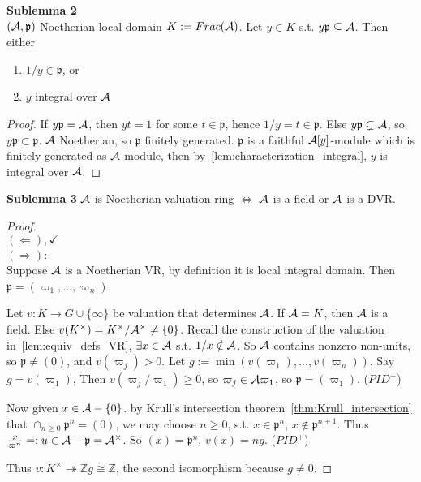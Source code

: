 \documentclass[11pt]{article}
\newcommand{\intg}{\mathbb Z}
\newcommand{\scp}{{\mathfrak p}}
\newcommand{\cala}{{\cal A}}
\newcommand{\Lrta}{\Longrightarrow}
\newcommand{\lrta}{\longrightarrow}
\newcommand{\Llta}{\Longleftarrow}
\newcommand{\Llrta}{\Longleftrightarrow}
\newcommand{\surj}{\twoheadrightarrow}
\begin{document}
\textbf{Sublemma 2}\\
$(\cala,\scp)$ Noetherian local domain $K:=Frac(\cala)$. Let $y\in K$ s.t. $y\scp\subseteq \cala$. Then either
\begin{enumerate}[label=(\roman*)]
\item $1/y\in \scp$, or
\item $y$ integral over $\cala$
\end{enumerate}
\begin{proof}
If $y\scp=\cala$, then $yt=1$ for some $t\in \scp$, hence $1/y=t\in\scp$. Else $y\scp\subsetneq \cala$, so $y\scp\subset\scp$. $\cala$ Noetherian, so $\scp$ finitely generated. $\scp$ is a faithful $\cala[y]$-module which is finitely generated as $\cala$-module, then by~\ref{lem:characterization_integral}, $y$ is integral over $\cala$.
\end{proof}
\textbf{Sublemma 3} $\cala$ is Noetherian valuation ring $\Llrta$ $\cala$ is a field or $\cala$ is a DVR.
\begin{proof}\ \\
$(\Llta), \checkmark$\\
$(\Lrta)$:\\
Suppose $\cala$ is a Noetherian VR, by definition it is local integral domain. Then $\scp=(\varpi_1,...,\varpi_n)$.

Let $v: K\lrta G\cup \{\infty\}$ be valuation that determines $\cala$. If $\cala=K$, then $\cala$ is a field. Else $v(K^\times)=K^\times/\cala^\times\neq \{0\}$. Recall the construction of the valuation in~\ref{lem:equiv_defs_VR}, $\exists x\in\cala $ s.t. $1/x\notin\cala$. So $\cala$ contains nonzero non-units, so $\scp\neq (0)$, and $v(\varpi_j)> 0$. Let $g:=\min(v(\varpi_1),...,v(\varpi_n))$. Say $g=v(\varpi_1)$, Then $v(\varpi_j/\varpi_1)\geq 0$, so $\varpi_j\in \cala \varpi_1$, so $\scp=(\varpi_1)$. ($PID^-$)

Now given $x\in \cala-\{0\}$. by Krull's intersection theorem~\ref{thm:Krull_intersection} that $\cap_{n\geq 0}\scp^n=(0)$, we may choose $n\geq 0$, s.t. $x\in \scp^n$, $x\notin \scp^{n+1}$. Thus $\frac{x}{\varpi^n}=:u\in \cala-\scp=\cala^\times$. So $(x)=\scp^n$, $v(x)=ng$. ($PID^+$)

Thus $v:K^\times \surj \intg g\cong \intg$, the second isomorphism because $g\neq 0$.
\end{proof}
\end{document}
